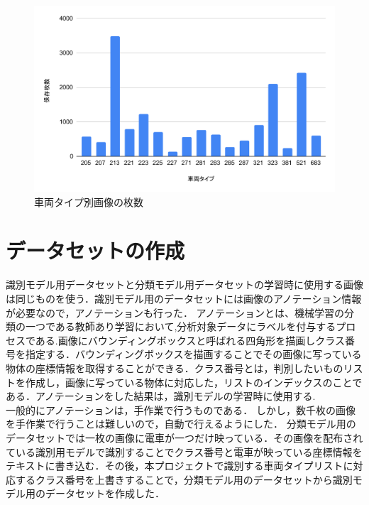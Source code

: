 \begin{figure}
	\centering
	\includegraphics[width=0.7\linewidth]{chap3/fig/chart.pdf}
	\caption{車両タイプ別画像の枚数}
	\label{fig:chart}
\end{figure}



\section{データセットの作成}

識別モデル用データセットと分類モデル用データセットの学習時に使用する画像は同じものを使う．識別モデル用のデータセットには画像のアノテーション情報が必要なので，アノテーションも行った．
アノテーションとは、機械学習の分類の一つである教師あり学習において,分析対象データにラベルを付与するプロセスである.画像にバウンディングボックスと呼ばれる四角形を描画しクラス番号を指定する．バウンディングボックスを描画することでその画像に写っている物体の座標情報を取得することができる．クラス番号とは，判別したいものリストを作成し，画像に写っている物体に対応した，リストのインデックスのことである．アノテーションをした結果は，識別モデルの学習時に使用する.\\
一般的にアノテーションは，手作業で行うものである．
しかし，数千枚の画像を手作業で行うことは難しいので，自動で行えるようにした．
分類モデル用のデータセットでは一枚の画像に電車が一つだけ映っている．その画像を配布されている識別用モデルで識別することでクラス番号と電車が映っている座標情報をテキストに書き込む．その後，本プロジェクトで識別する車両タイプリストに対応するクラス番号を上書きすることで，分類モデル用のデータセットから識別モデル用のデータセットを作成した．

